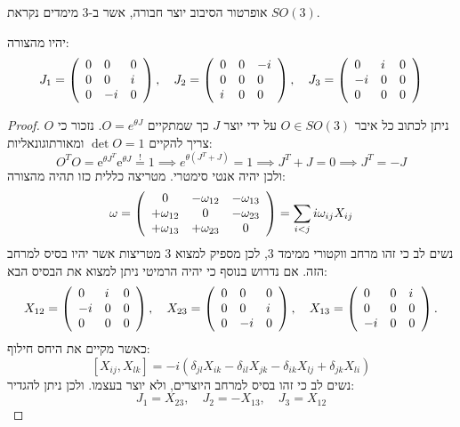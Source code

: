 \documentclass{tstextbook}
\begin{document}
\begin{proposition}
אופרטור הסיבוב יוצר חבורה, אשר ב-3 מימדים נקראת \(SO(3)\).

\end{proposition}
\begin{proposition}[היוצרים של SO(3)]
יהיו מהצורה:
$$J_{1}=\left(\begin{array}{l l l}{{0}}&{{0}}&{{0}}\\ {{0}}&{{0}}&{{i}}\\ {{0}}&{{-i}}&{{0}}\end{array}\right),\quad J_{2}=\left(\begin{array}{l l l}{{0}}&{{0}}&{{-i}}\\ {{0}}&{{0}}&{{0}}\\ {{i}}&{{0}}&{{0}}\end{array}\right),\quad J_{3}=\left(\begin{array}{l l l}{{0}}&{{i}}&{{0}}\\ {{-i}}&{{0}}&{{0}}\\ {{0}}&{{0}}&{{0}}\end{array}\right)$$

\end{proposition}
\begin{proof}
ניתן לכתוב כל איבר \(O \in SO(3)\) על ידי יוצר \(J\) כך שמתקיים \(O=e^{ \theta J }\).
נזכור כי \(O\) צריך להקיים \(\det O=1\) ומאורתוגונאליות:
$${ O}^{T}{ O}=\mathrm{e}^{\theta J^{T}}\mathrm{e}^{\theta J}\stackrel{!}{=}1 \implies e^{ \theta(J^{T}+J) }=1\implies J^{T}+J=0\implies J^{T}=-J$$
ולכן יהיה אנטי סימטרי. מטריצה כללית כזו תהיה מהצורה:
$$\omega=\left(\begin{array}{c c c}{{0}}&{{-\omega_{12}}}&{{-\omega_{13}}}\\ {{+\omega_{12}}}&{{0}}&{{-\omega_{23}}}\\ {{+\omega_{13}}}&{{+\omega_{23}}}&{{0}}\end{array}\right)=\sum_{i<j}i\omega_{i j}X_{i j}$$
נשים לב כי זהו מרחב ווקטורי ממימד 3, לכן מספיק למצוא 3 מטריצות אשר יהיו בסיס למרחב הזה. אם נדרוש בנוסף כי יהיה הרמיטי ניתן למצוא את הבסיס הבא:
$$X_{12}=\left(\begin{array}{l l l}{{0}}&{{i}}&{{0}}\\ {{-i}}&{{0}}&{{0}}\\ {{0}}&{{0}}&{{0}}\end{array}\right),\quad X_{23}=\left(\begin{array}{l l l}{{0}}&{{0}}&{{0}}\\ {{0}}&{{0}}&{{i}}\\ {{0}}&{{-i}}&{{0}}\end{array}\right),\quad X_{13}=\left(\begin{array}{l l l}{{0}}&{{0}}&{{i}}\\ {{0}}&{{0}}&{{0}}\\ {{-i}}&{{0}}&{{0}}\end{array}\right).$$
כאשר מקיים את היחס חילוף:
$$[X_{i j},X_{l k}]=-i\left(\delta_{j l}X_{i k}-\delta_{i l}X_{j k}-\delta_{i k}X_{l j}+\delta_{j k}X_{l i}\right)$$
נשים לב כי זהו בסיס למרחב היוצרים, ולא יוצר בעצמו. ולכן ניתן להגדיר:
$$J_{1}=X_{23},\quad J_{2}=-X_{13},\quad J_{3}=X_{12}$$

\end{proof}
\end{document}
